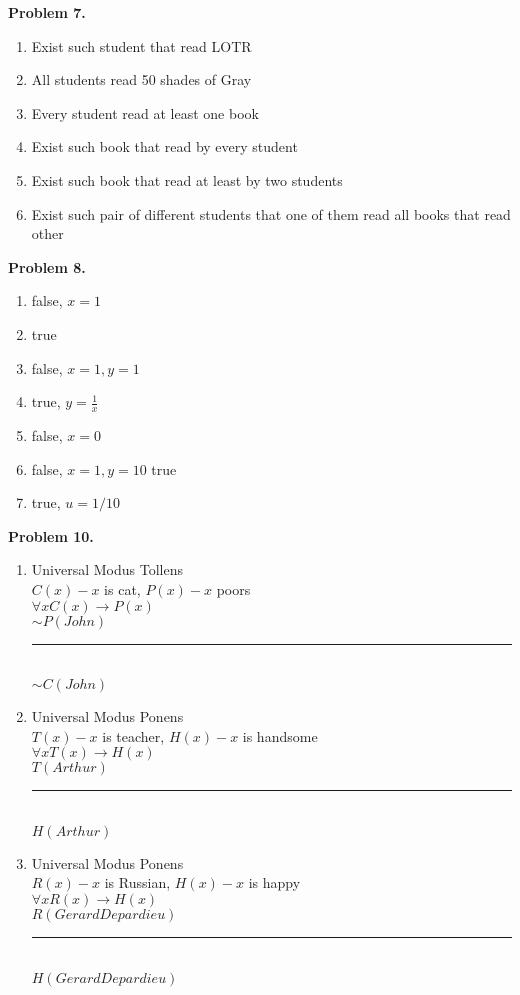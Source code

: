 \documentclass[a4paper,12pt]{article}
\newenvironment{problem}[1]{\par\bigskip\noindent\textbf{Problem #1.} \newline}{}
\begin{document}
  \begin{problem}{7}
    \begin{enumerate}
    \item Exist such student that read LOTR
    \item All students read 50 shades of Gray
    \item Every student read at least one book
    \item Exist such book that read by every student
    \item Exist such book that read at least by two students
    \item Exist such pair of different students that one of them read all books that read other
    \end{enumerate}

  \end{problem}


  \begin{problem}{8}
    \begin{enumerate}
    \item false, $x = 1$
    \item true
    \item false, $x = 1, y = 1$
    \item true, $y = \frac{1}{x}$
    \item false, $x = 0$
    \item false, $x = 1, y = 10$
    \itme true
    \item true, $u = 1/10$
    \end{enumerate}
  \end{problem}
  
  \begin{problem}{10}
    \begin{enumerate}
    \item Universal Modus Tollens \\
      $C(x) - x$ is cat, $P(x) - x$ poors \\
      $\forall x C(x) \rightarrow P(x)$ \\
      $\sim P(John)$\\
      \noindent\rule{2cm}{0.4pt} \\
      $\sim C(John)$
    \item Universal Modus Ponens \\
      $T(x) - x$ is teacher, $H(x) - x$ is handsome \\
      $\forall x T(x) \rightarrow H(x)$ \\
      $T(Arthur)$\\
      \noindent\rule{2cm}{0.4pt} \\
      $H(Arthur)$
    \item Universal Modus Ponens \\
      $R(x) - x$ is Russian, $H(x) - x$ is happy \\
      $\forall x R(x) \rightarrow H(x)$ \\
      $R(Gerard Depardieu)$\\
      \noindent\rule{4cm}{0.4pt} \\
      $H(Gerard Depardieu)$
    \end{enumerate}
  \end{problem}
\end{document}
